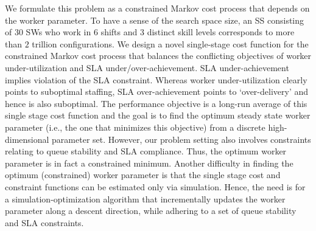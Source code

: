 \documentclass[11pt,letterpaper,english]{article}
\begin{document}
We formulate this problem as a constrained Markov cost process
that depends on the worker parameter. 
To have a sense of the search space size, an SS
consisting of $30$ SWs who work in $6$ shifts and $3$ distinct skill
levels corresponds to more than $2$ trillion configurations.  We
design a novel single-stage cost function for the constrained Markov
cost process that balances the conflicting objectives of
worker under-utilization and SLA under/over-achievement. SLA under-achievement implies violation of the SLA constraint. Whereas worker under-utilization clearly points to suboptimal staffing, SLA over-achievement 
points to `over-delivery' and hence is also suboptimal. The
performance objective is a long-run average of this single stage cost
function and the goal is to find the optimum steady state worker parameter (i.e., the one that
minimizes this objective) from a discrete high-dimensional parameter set. However, our problem setting also involves
constraints relating to queue stability and SLA compliance. Thus, the
optimum worker parameter is in fact a constrained minimum. Another difficulty
in finding the optimum (constrained) worker parameter is
that the single stage cost and constraint functions can be estimated only via
simulation. Hence, the need is for a simulation-optimization algorithm that
incrementally updates the worker parameter along a descent direction,
while adhering to a set of queue stability and SLA constraints.
\end{document}
